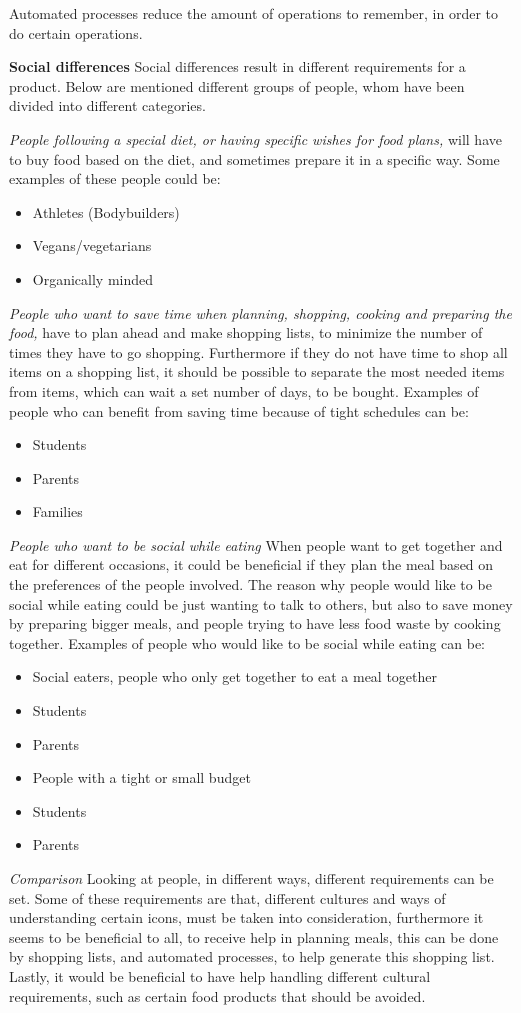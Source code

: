 Automated processes reduce the amount of operations to remember, in order to do certain operations.

\textbf{Social differences}
Social differences result in different requirements for a product. Below are mentioned different groups of people, whom have been divided into different categories.

\emph{People following a special diet, or having specific wishes for food plans,}
will have to buy food based on the diet, and sometimes prepare it in a specific way. Some examples of these people could be:
\begin{itemize}
\item Athletes (Bodybuilders)
\item Vegans/vegetarians
\item Organically minded
\end{itemize}

\emph{People who want to save time when planning, shopping, cooking and preparing the food,}
have to plan ahead and make shopping lists, to minimize the number of times they have to go shopping. Furthermore if they do not have time to shop all items on a shopping list, it should be possible to separate the most needed items from items, which can wait a set number of days, to be bought. Examples of people who can benefit from saving time because of tight schedules can be:
\begin{itemize}
\item Students
\item Parents
\item Families
\end{itemize}

\emph{People who want to be social while eating}
When people want to get together and eat for different occasions, it could be beneficial if they plan the meal based on the preferences of the people involved. The reason why people would like to be social while eating could be just wanting to talk to others, but also to save money by preparing bigger meals, and people trying to have less food waste by cooking together. Examples of people who would like to be social while eating can be:
\begin{itemize}
\item Social eaters, people who only get together to eat a meal together
\item Students
\item Parents
\item People with a tight or small budget
\item Students
\item Parents
\end{itemize}

\emph{Comparison}
Looking at people, in different ways, different requirements can be set. Some of these requirements are that, different cultures and ways of understanding certain icons, must be taken into consideration, furthermore it seems to be beneficial to all, to receive help in planning meals, this can be done by shopping lists, and automated processes, to help generate this shopping list. Lastly, it would be beneficial to have help handling different cultural requirements, such as certain food products that should be avoided.